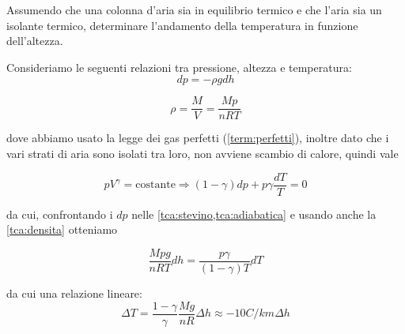 \documentclass[../main.tex]{subfiles}
\begin{document}

\textex

Assumendo che una colonna d'aria sia in equilibrio termico e che l'aria sia un isolante termico,
determinare l'andamento della temperatura in funzione dell'altezza.

\solution

Consideriamo le seguenti relazioni tra pressione, altezza e temperatura:
\begin{equation}
	\label{tca:stevino}
	dp = -\rho g dh
\end{equation}

\begin{equation}
	\label{tca:densita}
	\rho = \frac{M}{V} = \frac{Mp}{nRT}
\end{equation}

dove abbiamo usato la legge dei gas perfetti (\cref{term:perfetti}), inoltre dato che i vari strati di aria sono isolati tra loro, non avviene scambio
di calore, quindi vale

\begin{equation}
	\label{tca:adiabatica}
	pV^{\gamma} = \text{costante} \Rightarrow (1-\gamma)dp+p\gamma\frac{dT}{T} = 0
\end{equation}

da cui, confrontando i $dp$ nelle \cref{tca:stevino,tca:adiabatica} e usando anche la \cref{tca:densita}  otteniamo

\[
	\frac{Mpg}{nRT}dh = \frac{p\gamma}{(1-\gamma)T}dT
\]

da cui una relazione lineare:
\begin{equation}
	\label{tca:andamento}
	\Delta T = \frac{1-\gamma}{\gamma}\frac{Mg}{nR}\Delta h \approx -10 C/km \Delta h
\end{equation}
\end{document}

